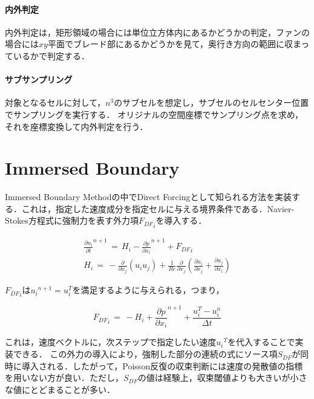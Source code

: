 %
\paragraph{内外判定}
内外判定は，矩形領域の場合には単位立方体内にあるかどうかの判定，ファンの場合には$xy$平面でブレード部にあるかどうかを見て，奥行き方向の範囲に収まっているかで判定する．

%
\paragraph{サブサンプリング}
対象となるセルに対して，$n^3$のサブセルを想定し，サブセルのセルセンター位置でサンプリングを実行する．
オリジナルの空間座標でサンプリング点を求め，それを座標変換して内外判定を行う．

\pagebreak
%
\section{Immersed Boundary}
\label{sec:Immersed Boundary Method}
Immersed Boundary Methodの中でDirect Forcingとして知られる方法\cite{Yusof:97:CTR-ARB}を実装する．これは，指定した速度成分を指定セルに与える境界条件である．Navier-Stokes方程式に強制力を表す外力項${F_{DF}}_{i}$を導入する．

\begin{equation}
\begin{array}{l}
\displaystyle{
{\frac{\partial u_{i}}{\partial t}}^{n+1} 
\, =\, H_{i}
- {\frac{\partial p}{\partial x_{i}}}^{n+1} + {F_{DF}}_{i}
}\\
\displaystyle{
H_{i} \,=\, - \frac{\partial}{\partial x_{j}} \left({ u_{i} u_{j} }\right)
+ \frac{1}{Re} \frac{\partial}{\partial x_{j}} 
\left({ \frac{\partial u_{i}}{\partial x_{j}} + \frac{\partial u_{j}}{\partial x_{i}} }\right) 
}
\end{array}
\label{NS_IB ND}
\end{equation}

${F_{DF}}_{i}$は${u_{i}}^{n+1}=u_{i}^{T}$を満足するように与えられる，つまり，

\begin{equation}
{F_{DF}}_{i} \,=\, - H_{i} 
+ {\frac{\partial p}{\partial x_{i}}}^{n+1}
+ \frac{u_{i}^{T} - u_{i}^{n}}{\Delta t}
\label{Direct forcing term}
\end{equation}

これは，速度ベクトルに，次ステップで指定したい速度${u_{i}}^{T}$を代入することで実装できる．
この外力の導入により，強制した部分の連続の式にソース項$S_{DF}$が同時に導入される．したがって，Poisson反復の収束判断には速度の発散値の指標を用いない方が良い．ただし，$S_{DF}$の値は経験上，収束閾値よりも大きいが小さな値にとどまることが多い．

